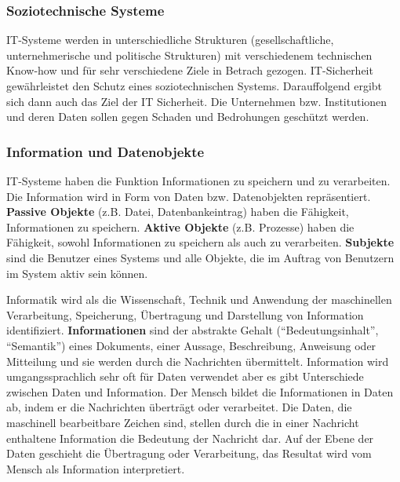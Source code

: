 \subsubsection{Soziotechnische Systeme}

IT-Systeme werden in unterschiedliche Strukturen (gesellschaftliche, unternehmerische und politische Strukturen) mit verschiedenem technischen Know-how und für sehr verschiedene Ziele in Betrach gezogen\cite[23]{eckert2013sicherheit}. IT-Sicherheit gewährleistet den Schutz eines soziotechnischen Systems. Darauffolgend ergibt sich dann auch das Ziel der IT Sicherheit. Die Unternehmen bzw. Institutionen und deren Daten sollen gegen Schaden und Bedrohungen geschützt werden\cite{so18tech}. 

\subsubsection{Information und Datenobjekte}

IT-Systeme haben die Funktion Informationen zu speichern und zu verarbeiten. Die Information wird in Form von Daten bzw. Datenobjekten repräsentiert. \textbf{Passive Objekte} (z.B. Datei, Datenbankeintrag) haben die Fähigkeit, Informationen zu speichern. \textbf{Aktive Objekte} (z.B. Prozesse) haben die Fähigkeit, sowohl Informationen zu speichern als auch zu verarbeiten\cite[23]{eckert2013sicherheit}.  \textbf{Subjekte} sind die Benutzer eines Systems und alle Objekte, die im Auftrag von Benutzern im System aktiv sein können\cite[24]{eckert2013sicherheit}.  

Informatik wird als die Wissenschaft, Technik und Anwendung der maschinellen Verarbeitung, Speicherung, Übertragung und Darstellung von Information identifiziert. \textbf{Informationen} sind der abstrakte Gehalt ("`Bedeutungsinhalt"', "`Semantik"') eines Dokuments, einer Aussage, Beschreibung, Anweisung oder Mitteilung\cite[5]{broy2013informatik} und sie werden durch die Nachrichten übermittelt\cite[18]{blieberger2013informatik}. Information wird umgangssprachlich sehr oft für Daten verwendet aber es gibt Unterschiede zwischen Daten und Information. Der Mensch bildet die Informationen in Daten ab, indem er die Nachrichten überträgt oder verarbeitet. Die Daten, die maschinell bearbeitbare Zeichen sind, stellen durch die in einer Nachricht enthaltene Information die Bedeutung der Nachricht dar. Auf der Ebene der Daten geschieht die Übertragung oder Verarbeitung, das Resultat wird vom Mensch als Information interpretiert\cite{infstd}.

